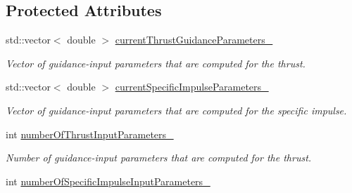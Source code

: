 \subsection*{Protected Attributes}
\begin{DoxyCompactItemize}
\item 
std\+::vector$<$ double $>$ \hyperlink{classtudat_1_1simulation__setup_1_1ThrustInputParameterGuidance_a7eb9a3b218117d9563401bbe9d23e8e8}{current\+Thrust\+Guidance\+Parameters\+\_\+}\hypertarget{classtudat_1_1simulation__setup_1_1ThrustInputParameterGuidance_a7eb9a3b218117d9563401bbe9d23e8e8}{}\label{classtudat_1_1simulation__setup_1_1ThrustInputParameterGuidance_a7eb9a3b218117d9563401bbe9d23e8e8}

\begin{DoxyCompactList}\small\item\em Vector of guidance-\/input parameters that are computed for the thrust. \end{DoxyCompactList}\item 
std\+::vector$<$ double $>$ \hyperlink{classtudat_1_1simulation__setup_1_1ThrustInputParameterGuidance_ad9c6cba5fe4f3513fcdeda718c88d738}{current\+Specific\+Impulse\+Parameters\+\_\+}\hypertarget{classtudat_1_1simulation__setup_1_1ThrustInputParameterGuidance_ad9c6cba5fe4f3513fcdeda718c88d738}{}\label{classtudat_1_1simulation__setup_1_1ThrustInputParameterGuidance_ad9c6cba5fe4f3513fcdeda718c88d738}

\begin{DoxyCompactList}\small\item\em Vector of guidance-\/input parameters that are computed for the specific impulse. \end{DoxyCompactList}\item 
int \hyperlink{classtudat_1_1simulation__setup_1_1ThrustInputParameterGuidance_a094b1b561616559ae6dc27eb39828245}{number\+Of\+Thrust\+Input\+Parameters\+\_\+}\hypertarget{classtudat_1_1simulation__setup_1_1ThrustInputParameterGuidance_a094b1b561616559ae6dc27eb39828245}{}\label{classtudat_1_1simulation__setup_1_1ThrustInputParameterGuidance_a094b1b561616559ae6dc27eb39828245}

\begin{DoxyCompactList}\small\item\em Number of guidance-\/input parameters that are computed for the thrust. \end{DoxyCompactList}\item 
int \hyperlink{classtudat_1_1simulation__setup_1_1ThrustInputParameterGuidance_a52a9cf24d20b1a71f470542975813ee7}{number\+Of\+Specific\+Impulse\+Input\+Parameters\+\_\+}\hypertarget{classtudat_1_1simulation__setup_1_1ThrustInputParameterGuidance_a52a9cf24d20b1a71f470542975813ee7}{}\label{classtudat_1_1simulation__setup_1_1ThrustInputParameterGuidance_a52a9cf24d20b1a71f470542975813ee7}


\end{DoxyCompactItemize}
